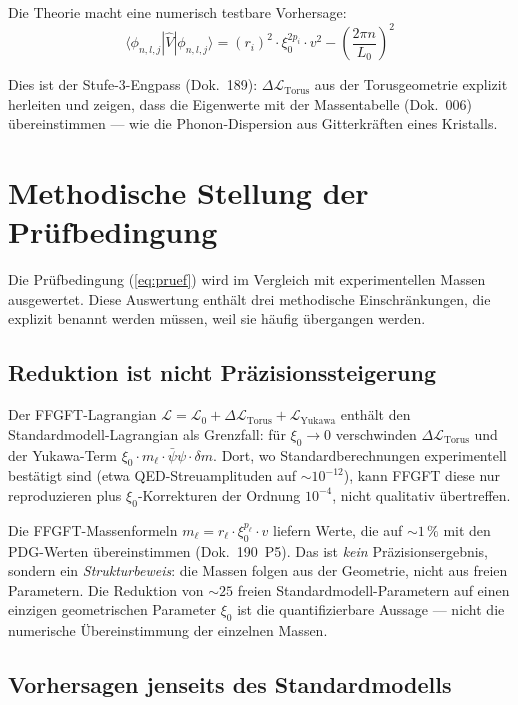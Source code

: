 Die Theorie macht eine numerisch testbare Vorhersage:
\begin{equation}
  \boxed{
    \langle\phi_{n,l,j}|\hat{V}|\phi_{n,l,j}\rangle
    = (r_i)^2 \cdot \xi_0^{2p_i} \cdot v^2
      - \left(\frac{2\pi n}{L_0}\right)^2
  }
  \label{eq:pruef}
\end{equation}

Dies ist der Stufe-3-Engpass (Dok.~189): $\Delta\mathcal{L}_{\text{Torus}}$
aus der Torusgeometrie explizit herleiten und zeigen, dass die Eigenwerte
mit der Massentabelle (Dok.~006) übereinstimmen — wie die Phonon-Dispersion
aus Gitterkräften eines Kristalls.

\section{Methodische Stellung der Prüfbedingung}

Die Prüfbedingung (\ref{eq:pruef}) wird im Vergleich mit experimentellen
Massen ausgewertet. Diese Auswertung enthält drei methodische
Einschränkungen, die explizit benannt werden müssen, weil sie häufig
übergangen werden.

\subsection*{Reduktion ist nicht Präzisionssteigerung}

Der FFGFT-Lagrangian
$\mathcal{L} = \mathcal{L}_0 + \Delta\mathcal{L}_{\text{Torus}} + \mathcal{L}_{\text{Yukawa}}$
enthält den Standardmodell-Lagrangian als Grenzfall: für $\xi_0 \to 0$
verschwinden $\Delta\mathcal{L}_{\text{Torus}}$ und der Yukawa-Term
$\xi_0\cdot m_\ell\cdot\bar\psi\psi\cdot\delta m$. Dort, wo
Standardberechnungen experimentell bestätigt sind (etwa QED-Streuamplituden
auf $\sim 10^{-12}$), kann FFGFT diese nur reproduzieren plus
$\xi_0$-Korrekturen der Ordnung $10^{-4}$, nicht qualitativ übertreffen.

Die FFGFT-Massenformeln $m_\ell = r_\ell\cdot\xi_0^{p_\ell}\cdot v$
liefern Werte, die auf $\sim 1\,\%$ mit den PDG-Werten übereinstimmen
(Dok.~190~P5). Das ist \emph{kein} Präzisionsergebnis, sondern ein
\emph{Strukturbeweis}: die Massen folgen aus der Geometrie, nicht aus
freien Parametern. Die Reduktion von $\sim 25$ freien
Standardmodell-Parametern auf einen einzigen geometrischen Parameter
$\xi_0$ ist die quantifizierbare Aussage --- nicht die numerische
Übereinstimmung der einzelnen Massen.

\subsection*{Vorhersagen jenseits des Standardmodells}

